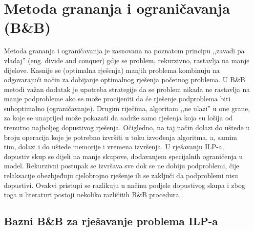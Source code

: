\documentclass[b5paper, utf8, 11pt, colorlinks]{book}
\theoremstyle{definition}
\begin{document}
\section{Metoda grananja i ograničavanja (B\&B)}\label{sec:bb}
Metoda grananja i ograničavanja  je zasnovana na poznatom principu ,,zavadi pa vladaj'' (eng. divide and conquer) gdje se problem, rekurzivno, rastavlja na manje dijelove. Kasnije se (optimalna rješenja) manjih problema kombinuju na odgovarajući način za dobijanje optimalnog rješenja početnog problema.  U B\&B metodi važan dodatak je upotreba strategije da se 
problem nikada ne rastavlja na manje podprobleme ako se može procijeniti da će rješenje podproblema biti suboptimalno (ograničavanje). Drugim riječima, algoritam ,,ne ulazi'' u one grane, za koje se unaprijed može pokazati da sadrže samo  rješenja koja su lošija od trenutno najboljeg dopustivog rješenja. Očigledno, na taj način dolazi do uštede u broju operacija koje je potrebno izvršiti u toku izvođenja algoritma, a, samim tim, dolazi i do uštede memorije i vremena izvršenja. U rješavanju ILP-a, dopustiv skup se dijeli na manje skupove, dodavanjem specijalnih ograničenja u model. Rekurzivni postupak se izvršava sve  dok se ne dobiju podproblemi, čije relaksacije obezbjeđuju cjelobrojno rješenje ili se zaključi da podproblemi nisu dopustivi. Ovakvi pristupi se razlikuju u načinu podjele dopustivog skupa i zbog toga  u literaturi  postoji nekoliko različitih B\&B procedura. 

\subsection{Bazni B\&B za rješavanje problema ILP-a}
\end{document}
